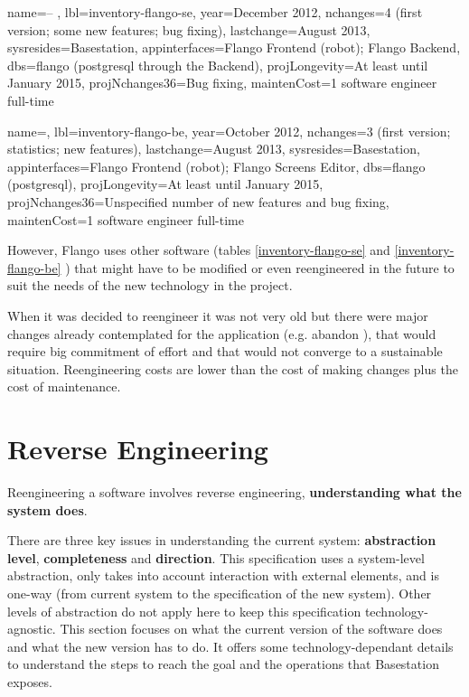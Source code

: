 \begin{inventory}
{
name=\flangofe -- \se , 
lbl=inventory-flango-se, 
year=December 2012,
nchanges=4 (first version; some new features; bug fixing),
lastchange=August 2013,
sysresides=Basestation,
appinterfaces=Flango Frontend (robot); Flango Backend,
dbs=flango (postgresql through the Backend),
projLongevity=At least until January 2015,
projNchanges36=Bug fixing,
maintenCost=1 software engineer full-time
}
\end{inventory}

\begin{inventory}
{
name=\flangobe , 
lbl=inventory-flango-be, 
year=October 2012,
nchanges=3 (first version; statistics; new features),
lastchange=August 2013,
sysresides=Basestation,
appinterfaces=Flango Frontend (robot); Flango Screens Editor,
dbs=flango (postgresql),
projLongevity=At least until January 2015,
projNchanges36=Unspecified number of new features and bug fixing,
maintenCost=1 software engineer full-time
}
\end{inventory} 

However, Flango \cm uses other software (tables \ref{inventory-flango-se} and \ref{inventory-flango-be} ) that might have to be modified or even reengineered in the future to suit the needs of the new technology in the project.

When it was decided to reengineer \flangofe it was not very old but there were major changes already contemplated for the application (e.g. abandon \flash), that would require big commitment of effort and that would not converge to a sustainable situation.
Reengineering costs are lower than the cost of making changes plus the cost of maintenance.

\section{Reverse Engineering}
\label{sec:reverse-eng}
Reengineering a software involves reverse engineering, \textbf{understanding what the system does}.

There are three key issues in understanding the current system: \textbf{abstraction level}, \textbf{completeness} and \textbf{direction}.
This specification uses a system-level abstraction, only takes into account interaction with external elements, and is one-way (from current system to the specification of the new system).
Other levels of abstraction do not apply here to keep this specification technology-agnostic.
This section focuses on what the current version of the software does and what the new version has to do.
It offers some technology-dependant details to understand the steps to reach the goal and the operations that Basestation exposes.

